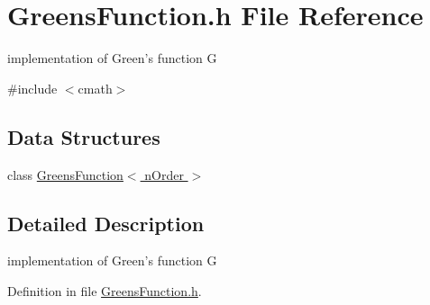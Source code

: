 \section{GreensFunction.h File Reference}
\label{GreensFunction_8h}


implementation of Green's function G  


{\ttfamily \#include $<$cmath$>$}\par
\subsection*{Data Structures}
\begin{DoxyCompactItemize}
\item 
class \hyperlink{classGreensFunction}{GreensFunction$<$ nOrder $>$}
\end{DoxyCompactItemize}


\subsection{Detailed Description}
implementation of Green's function G 

Definition in file \hyperlink{GreensFunction_8h_source}{GreensFunction.h}.


